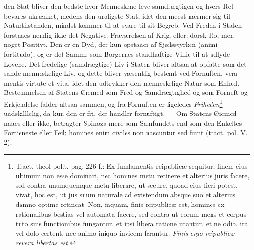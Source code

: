 \documentclass[12pt,a4paper]{book}
\begin{document}
den Stat bliver den bedste hvor Menneskene leve samdrægtigen og hvers Ret bevares ukrænket, medens den uroligste Stat, idet den meest nærmer sig til Naturtilstanden, mindst kommer til at svare til sit Begreb. Ved Freden i Staten forstaaes nemlig ikke det Negative: Fraværelsen af Krig, eller: dorsk Ro, men noget Positivt. Den er en Dyd, der kun opstaaer af Sjælsstyrken (animi fortitudo), og er det Samme som Borgernes standhaftige Villie til at adlyde Lovene. Det fredelige (samdrægtige) Liv i Staten bliver altsaa at opfatte som det sande menneskelige Liv, og dette bliver væsentlig bestemt ved Fornuften, vera mentis virtute et vita, idet den udtrykker den menneskelige Natur som Enhed. Bestemmelsen af Statens Øiemed som Fred og Samdrægtighed og som Fornuft og Erkjendelse falder altsaa sammen, og fra Fornuften er ligeledes \emph{Friheden}\footnote{Tract. theol-polit. pag. 226 f.: Ex fundamentis reipublicæ sequitur, finem eius ultimum non esse dominari, nec homines metu retinere et alterius juris facere, sed contra unumquemque metu liberare, ut secure, quoad eius fieri potest, vivat, hoc est, ut jus suum naturale ad existendum absque suo et alterius damno optime retineat. Non, inquam, finis reipublicæ est, homines ex rationalibus bestias vel automata facere, sed contra ut eorum mens et corpus tuto suis functionibus fungantur, et ipsi libera ratione utantur, et ne odio, ira vel dolo certent, nec animo iniquo invicem ferantur. \emph{Finis ergo reipublicæ revera libertas est.}} uadskilllelig, da kun den er fri, der handler fornuftigt. --- Om Statens Øiemed naaes eller ikke, betragter Spinoza mere som Samfundets end som den Enkeltes Fortjeneste eller Feil; homines enim civiles non nascuntur sed fiunt (tract. pol. V, 2).
\end{document}
